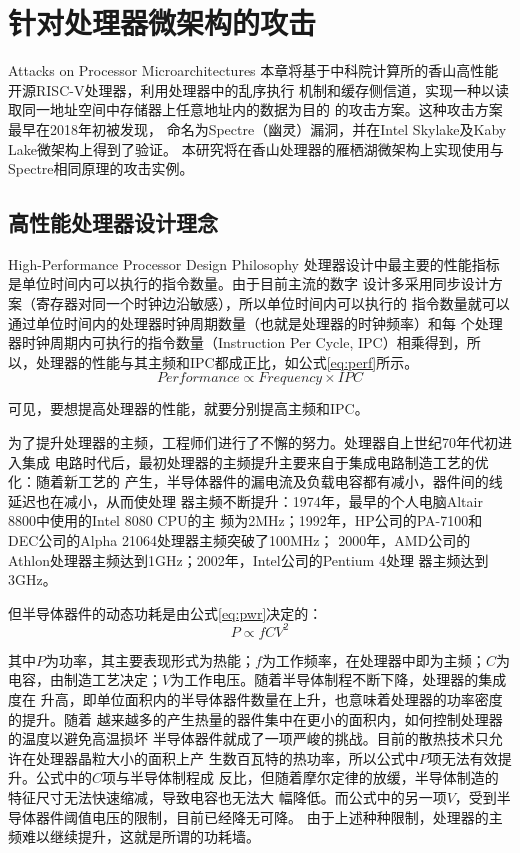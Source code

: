 
\chapter{针对处理器微架构的攻击}{Attacks on Processor Microarchitectures}
本章将基于中科院计算所的香山高性能开源RISC-V处理器，利用处理器中的乱序执行
机制和缓存侧信道，实现一种以读取同一地址空间中存储器上任意地址内的数据为目的
的攻击方案。这种攻击方案最早在2018年初被\citet{kocher_spectre_2019}发现，
命名为Spectre（幽灵）漏洞，并在Intel Skylake及Kaby Lake微架构上得到了验证。
本研究将在香山处理器的雁栖湖微架构上实现使用与Spectre相同原理的攻击实例。


\section{高性能处理器设计理念}{High-Performance Processor Design Philosophy}
处理器设计中最主要的性能指标是单位时间内可以执行的指令数量。由于目前主流的数字
设计多采用同步设计方案（寄存器对同一个时钟边沿敏感），所以单位时间内可以执行的
指令数量就可以通过单位时间内的处理器时钟周期数量（也就是处理器的时钟频率）和每
个处理器时钟周期内可执行的指令数量（Instruction Per Cycle, IPC）相乘得到，所
以，处理器的性能与其主频和IPC都成正比，如公式\ref{eq:perf}所示。
\begin{equation}
    Performance \propto Frequency \times IPC \label{eq:perf}
\end{equation}

可见，要想提高处理器的性能，就要分别提高主频和IPC。

为了提升处理器的主频，工程师们进行了不懈的努力。处理器自上世纪70年代初进入集成
电路时代后，最初处理器的主频提升主要来自于集成电路制造工艺的优化：随着新工艺的
产生，半导体器件的漏电流及负载电容都有减小，器件间的线延迟也在减小，从而使处理
器主频不断提升：1974年，最早的个人电脑Altair 8800中使用的Intel 8080 CPU的主
频为2MHz；1992年，HP公司的PA-7100和DEC公司的Alpha 21064处理器主频突破了100MHz；
2000年，AMD公司的Athlon处理器主频达到1GHz；2002年，Intel公司的Pentium 4处理
器主频达到3GHz\cite{enwiki:clock}。

但半导体器件的动态功耗是由公式\ref{eq:pwr}决定的：
\begin{equation}
    P \propto f C V^2 \label{eq:pwr}
\end{equation}

其中$P$为功率，其主要表现形式为热能；$f$为工作频率，在处理器中即为主频；$C$为
电容，由制造工艺决定；$V$为工作电压。随着半导体制程不断下降，处理器的集成度在
升高，即单位面积内的半导体器件数量在上升，也意味着处理器的功率密度的提升。随着
越来越多的产生热量的器件集中在更小的面积内，如何控制处理器的温度以避免高温损坏
半导体器件就成了一项严峻的挑战。目前的散热技术只允许在处理器晶粒大小的面积上产
生数百瓦特的热功率，所以公式中$P$项无法有效提升。公式中的$C$项与半导体制程成
反比，但随着摩尔定律的放缓，半导体制造的特征尺寸无法快速缩减，导致电容也无法大
幅降低。而公式中的另一项$V$，受到半导体器件阈值电压的限制，目前已经降无可降。
由于上述种种限制，处理器的主频难以继续提升，这就是所谓的功耗墙。

